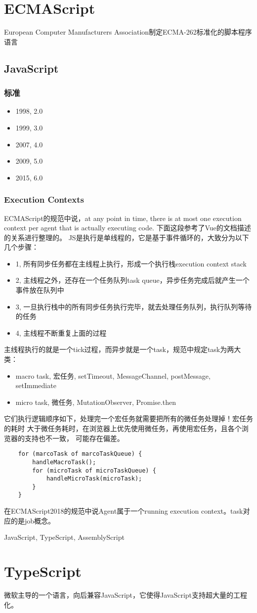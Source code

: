 \chapter{ECMAScript}

European Computer Manufacturers Association制定ECMA-262标准化的脚本程序语言

\section{JavaScript}

\subsection{标准}
\begin{itemize}
    \item {1998, 2.0}
    \item {1999, 3.0}
    \item {2007, 4.0}
    \item {2009, 5.0}
    \item {2015, 6.0}
\end{itemize}

\subsection{Execution Contexts}
ECMAScript的规范中说，at any point in time, there is at most one execution context per agent
that is actually executing code.
下面这段参考了Vue的文档描述的关系进行整理的。
JS是执行是单线程的，它是基于事件循环的，大致分为以下几个步骤：
\begin{itemize}
    \item {1, 所有同步任务都在主线程上执行，形成一个执行栈execution context stack}
    \item {2, 主线程之外，还存在一个任务队列task queue，异步任务完成后就产生一个事件放在队列中}
    \item {3, 一旦执行栈中的所有同步任务执行完毕，就去处理任务队列，执行队列等待的任务}
    \item {4, 主线程不断重复上面的过程}
\end{itemize}
主线程执行的就是一个tick过程，而异步就是一个task，规范中规定task为两大类：
\begin{itemize}
    \item {macro task, 宏任务, setTimeout, MessageChannel, postMessage, setImmediate}
    \item {micro task, 微任务, MutationObserver, Promise.then}
\end{itemize}
它们执行逻辑顺序如下，处理完一个宏任务就需要把所有的微任务处理掉！宏任务的耗时
大于微任务耗时，在浏览器上优先使用微任务，再使用宏任务，且各个浏览器的支持也不一致，
可能存在偏差。
\begin{lstlisting}
    for (marcoTask of marcoTaskQueue) {
        handleMacroTask();
        for (microTask of microTaskQueue) {
            handleMicroTask(microTask);
        }
    }
\end{lstlisting}
在ECMAScript2018的规范中说Agent属于一个running execution context。task对应的是job概念。

JavaScript, TypeScript, AssemblyScript

\chapter{TypeScript}
微软主导的一个语言，向后兼容JavaScript，它使得JavaScript支持超大量的工程化。